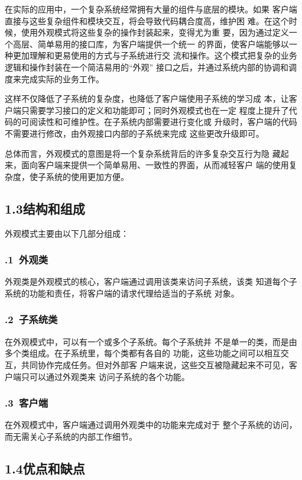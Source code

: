 \documentclass[24pt,a4paper]{article}%
\begin{document}
在实际的应用中，一个复杂系统经常拥有大量的组件与底层的模块。如果
客户端直接与这些复杂组件和模块交互，将会导致代码耦合度高，维护困
难。在这个时候，使用外观模式将这些复杂的操作封装起来，变得尤为重
要，因为通过定义一个高层、简单易用的接口库，为客户端提供一个统一
的界面，使客户端能够以一种更加理解和更易使用的方式与子系统进行交
流和操作。这个模式把复杂的业务逻辑和操作封装在一个简洁易用的“外观”
接口之后，并通过系统内部的协调和调度来完成实际的业务工作。

这样不仅降低了子系统的复杂度，也降低了客户端使用子系统的学习成
本，让客户端只需要学习接口的定义和功能即可；同时外观模式也在一定
程度上提升了代码的可阅读性和可维护性。在子系统内部需要进行变化或
升级时，客户端的代码不需要进行修改，由外观接口内部的子系统来完成
这些更改升级即可。

总体而言，外观模式的意图是将一个复杂系统背后的许多复杂交互行为隐
藏起来，面向客户端来提供一个简单易用、一致性的界面，从而减轻客户
端的使用复杂度，使子系统的使用更加方便。
\subsection*{\songti 1.3结构和组成}
外观模式主要由以下几部分组成：
\subsubsection*{.1\ 外观类}
外观类是外观模式的核心，客户端通过调用该类来访问子系统，该类
知道每个子系统的功能和责任，将客户端的请求代理给适当的子系统
对象。
\subsubsection*{.2\ 子系统类}
在外观模式中，可以有一个或多个子系统。每个子系统并
不是单一的类，而是由多个类组成。在子系统里，每个类都有各自的
功能，这些功能之间可以相互交互，共同协作完成任务。但对外部客
户端来说，这些交互被隐藏起来不可见，客户端只可以通过外观类来
访问子系统的各个功能。
\subsubsection*{.3\ 客户端}
在外观模式中，客户端通过调用外观类中的功能来完成对于
整个子系统的访问，而无需关心子系统的内部工作细节。
\subsection*{\songti 1.4优点和缺点}
\end{document}
